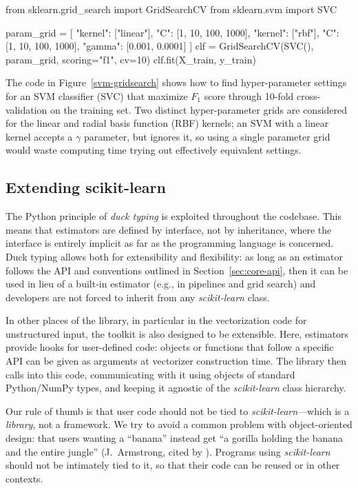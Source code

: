 \documentclass[twocolumn]{article}
\newcommand{\sklearn}{\textit{scikit-learn}\xspace}
\begin{document}
\begin{figure*}[t]
\begin{pythoncode}
from sklearn.grid_search import GridSearchCV
from sklearn.svm import SVC

param_grid = [
  {"kernel": ["linear"], "C": [1, 10, 100, 1000]},
  {"kernel": ["rbf"], "C": [1, 10, 100, 1000],
   "gamma": [0.001, 0.0001]}
]
clf = GridSearchCV(SVC(), param_grid, scoring="f1", cv=10)
clf.fit(X_train, y_train)
\end{pythoncode}
\caption{Optimizing the hyper-parameters of an SVM for $F_1$ score.}
\label{svm-gridsearch}
\end{figure*}

The code in Figure~\ref{svm-gridsearch} shows how to find
hyper-parameter settings for an SVM classifier (SVC)
that maximize $F_1$ score
through 10-fold cross-validation on the training set.
Two distinct hyper-parameter grids are
considered for the linear and radial basis function (RBF) kernels;
an SVM with a linear kernel accepts a $\gamma$ parameter, but ignores it,
so using a single parameter grid would waste computing time
trying out effectively equivalent settings.

\subsection{Extending scikit-learn}

The Python principle of \textit{duck typing} is exploited
throughout the codebase. This means that estimators are defined by interface,
not by inheritance, where the interface is entirely implicit
as far as the programming language is concerned.
Duck typing allows both for extensibility and
flexibility: as long as an estimator follows the API and conventions
outlined in Section~\ref{sec:core-api}, then it can be used in lieu of a
built-in estimator (e.g., in pipelines and grid search)
and developers are not forced to inherit from any \sklearn class.

In other places of the library, in particular in the vectorization code
for unstructured input, the toolkit is also designed to be
extensible. Here, estimators provide hooks for user-defined code: objects or
functions that follow a specific API can be given as arguments at vectorizer
construction time. The library then calls into this code,
communicating with it using objects of standard Python/NumPy types,
and keeping it agnostic of the \sklearn class hierarchy.

Our rule of thumb is that user code should not be tied to \sklearn---which is a
\textit{library}, not a framework. We try to avoid a
common problem with object-oriented design: that users wanting a
``banana'' instead get ``a gorilla holding the banana and the entire jungle''
(J.~Armstrong, cited by \citealp[p.~213]{seibel2009coders}).
Programs using \sklearn should not be intimately tied to it,
so that their code can be reused or in other contexts.
\end{document}
